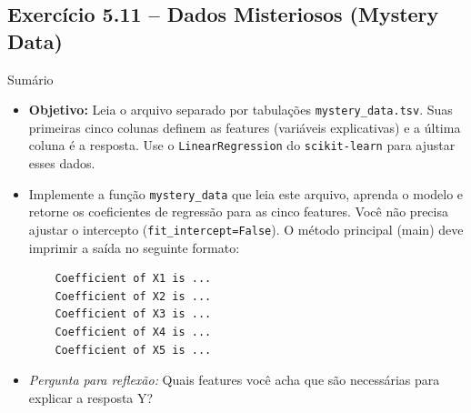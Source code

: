 \documentclass[11pt,a4paper]{article}
\begin{document}
\subsection*{Exercício 5.11 -- Dados Misteriosos (Mystery Data)}
\begin{exercicio}{Sumário}
\begin{itemize}
    \item \textbf{Objetivo:} Leia o arquivo separado por tabulações \texttt{mystery\_data.tsv}. Suas primeiras cinco colunas definem as features (variáveis explicativas) e a última coluna é a resposta. Use o \texttt{LinearRegression} do \texttt{scikit-learn} para ajustar esses dados.
    \item Implemente a função \texttt{mystery\_data} que leia este arquivo, aprenda o modelo e retorne os coeficientes de regressão para as cinco features. Você não precisa ajustar o intercepto (\texttt{fit\_intercept=False}). O método principal (main) deve imprimir a saída no seguinte formato:
    \begin{verbatim}
    Coefficient of X1 is ...
    Coefficient of X2 is ...
    Coefficient of X3 is ...
    Coefficient of X4 is ...
    Coefficient of X5 is ...
    \end{verbatim}
    \item \textit{Pergunta para reflexão:} Quais features você acha que são necessárias para explicar a resposta Y?
\end{itemize}
\end{exercicio}
\end{document}
